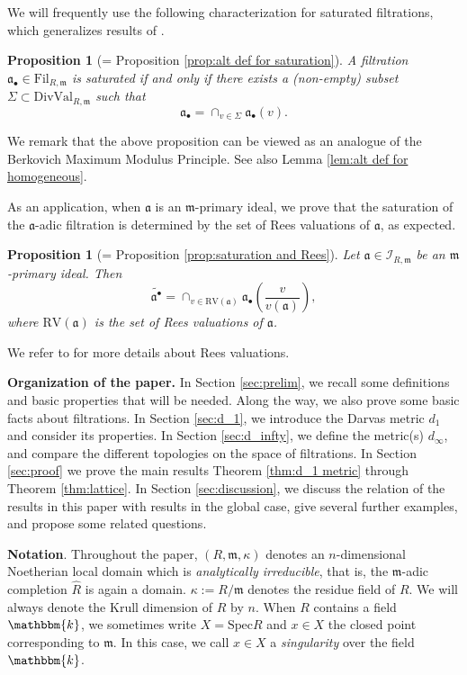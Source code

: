 \documentclass[11pt, leqno]{amsart}%
\theoremstyle{plain}
\newtheorem{proposition}[theorem]{Proposition}
\theoremstyle{definition}
\theoremstyle{remark}
\newcommand{\cI}{\mathcal{I}}
\newcommand{\fa}{\mathfrak{a}}
\newcommand{\fm}{\mathfrak{m}}
\newcommand{\DivVal}{\mathrm{DivVal}}
\newcommand{\Spec}{\mathrm{Spec}}
\newcommand{\bk}{\mathbbm{k}}
\newcommand{\RV}{\mathrm{RV}}
\newcommand{\Fil}{\mathrm{Fil}}
\numberwithin{equation}{section}
\begin{document}
\medskip

We will frequently use the following characterization for saturated filtrations, which generalizes results of \cites{Ree56a,Ree56b}. 

\begin{proposition}[= Proposition \ref{prop:alt def for saturation}]
    A filtration $\fa_\bullet\in\Fil_{R,\fm}$ is saturated if and only if there exists a (non-empty) subset $\Sigma\subset \DivVal_{R,\fm}$ such that 
    \[
        \fa_\bullet=\cap_{v\in \Sigma} \fa_\bullet(v).
    \]
\end{proposition}

We remark that the above proposition can be viewed as an analogue of the Berkovich Maximum Modulus Principle. See also Lemma \ref{lem:alt def for homogeneous}. %

As an application, when $\fa$ is an $\fm$-primary ideal, we prove that the saturation of the $\fa$-adic filtration is determined by the set of Rees valuations of $\fa$, as expected.

\begin{proposition}[= Proposition \ref{prop:saturation and Rees}]
    Let $\fa\in\cI_{R,\fm}$ be an $\fm$-primary ideal. Then 
    \[
        \widetilde{\fa^\bullet}=
        \cap_{v\in \RV(\fa)}\fa_\bullet(\frac{v}{v(\fa)}),
    \]
    where $\RV(\fa)$ is the set of Rees valuations of $\fa$.
\end{proposition}

We refer to \cite[Chapter 10]{HS06} for more details about Rees valuations.


\medskip


\noindent \textbf{Organization of the paper.}
In Section \ref{sec:prelim}, we recall some definitions and basic properties that will be needed. Along the way, we also prove some basic facts about filtrations. 
In Section \ref{sec:d_1}, we introduce the Darvas metric $d_1$ and consider its properties.
In Section \ref{sec:d_infty}, we define the metric(s) $d_\infty$, and compare the different topologies on the space of filtrations. 
In Section \ref{sec:proof} we prove the main results Theorem \ref{thm:d_1 metric} through Theorem \ref{thm:lattice}. 
In Section \ref{sec:discussion}, we discuss the relation of the results in this paper with results in the global case, give several further examples, and propose some related questions.

\bigskip

\noindent \textbf{Notation}.
Throughout the paper, $(R,\fm,\kappa)$ denotes an $n$-dimensional Noetherian local domain which is \emph{analytically irreducible}, that is, the $\fm$-adic completion $\hat{R}$ is again a domain. $\kappa:=R/\fm$ denotes the residue field of $R$. We will always denote the Krull dimension of $R$ by $n$. When $R$ contains a field $\bk$, we sometimes write $X=\Spec R$ and $x\in X$ the closed point corresponding to $\fm$. In this case, we call $x\in X$ a \emph{singularity} over the field $\bk$. 
\end{document}
